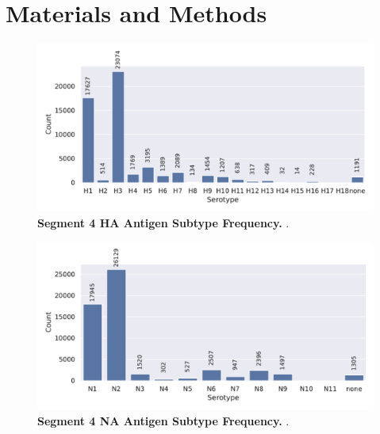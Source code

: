 \chapter{Materials and Methods} \label{chap:2}

\begin{figure}[!hbt]
    \includegraphics[width=\dimexpr\textwidth-2\fboxsep-2\fboxrule,fbox]{PCA/Data_Overview_Segment_4_H.pdf}
    \caption[Segment 4 \Acrlong{HA} Antigen Subtype Frequency]{\textbf{Segment 4 \Acrlong{HA} Antigen Subtype Frequency.} .}
    \label{fig:2.0.1}
\end{figure}

\begin{figure}[!hbt]
    \includegraphics[width=\dimexpr\textwidth-2\fboxsep-2\fboxrule,fbox]{PCA/Data_Overview_Segment_6_N.pdf}
    \caption[Segment 6 \Acrlong{NA} Antigen Subtype Frequency]{\textbf{Segment 4 \Acrlong{NA} Antigen Subtype Frequency.} .}
    \label{fig:2.0.2}
\end{figure}











